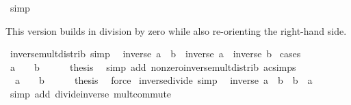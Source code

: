 \begin{isabellebody}
\ simp%
\endisatagproof
{\isafoldproof}%
%
\isadelimproof
%
\endisadelimproof
%
\begin{isamarkuptext}%
This version builds in division by zero while also re-orienting
      the right-hand side.%
\end{isamarkuptext}\isamarkuptrue%
\isamarkupfalse%
\ inverse{\isacharunderscore}{\kern0pt}mult{\isacharunderscore}{\kern0pt}distrib\ {\isacharbrackleft}{\kern0pt}simp{\isacharbrackright}{\kern0pt}{\isacharcolon}{\kern0pt}\isanewline
\ \ {\isachardoublequoteopen}inverse\ {\isacharparenleft}{\kern0pt}a\ {\isacharasterisk}{\kern0pt}\ b{\isacharparenright}{\kern0pt}\ {\isacharequal}{\kern0pt}\ inverse\ a\ {\isacharasterisk}{\kern0pt}\ inverse\ b{\isachardoublequoteclose}\isanewline
%
\isadelimproof
%
\endisadelimproof
%
\isatagproof
{}\isamarkupfalse%
\ cases\isanewline
\ \ \isamarkupfalse%
\ {\isachardoublequoteopen}a\ {\isasymnoteq}\ {}\ {\isasymand}\ b\ {\isasymnoteq}\ {}{\isachardoublequoteclose}\isanewline
\ \ \isamarkupfalse%
\ {\isacharquery}{\kern0pt}thesis\ \isamarkupfalse%
\ {\isacharparenleft}{\kern0pt}simp\ add{\isacharcolon}{\kern0pt}\ nonzero{\isacharunderscore}{\kern0pt}inverse{\isacharunderscore}{\kern0pt}mult{\isacharunderscore}{\kern0pt}distrib\ ac{\isacharunderscore}{\kern0pt}simps{\isacharparenright}{\kern0pt}\isanewline
{}\isamarkupfalse%
\isanewline
\ \ \isamarkupfalse%
\ {\isachardoublequoteopen}{\isasymnot}\ {\isacharparenleft}{\kern0pt}a\ {\isasymnoteq}\ {}\ {\isasymand}\ b\ {\isasymnoteq}\ {}{\isacharparenright}{\kern0pt}{\isachardoublequoteclose}\isanewline
\ \ \isamarkupfalse%
\ {\isacharquery}{\kern0pt}thesis\ \isamarkupfalse%
\ force\isanewline
{}\isamarkupfalse%
%
\endisatagproof
{\isafoldproof}%
%
\isadelimproof
\isanewline
%
\endisadelimproof
\isanewline
{}\isamarkupfalse%
\ inverse{\isacharunderscore}{\kern0pt}divide\ {\isacharbrackleft}{\kern0pt}simp{\isacharbrackright}{\kern0pt}{\isacharcolon}{\kern0pt}\isanewline
\ \ {\isachardoublequoteopen}inverse\ {\isacharparenleft}{\kern0pt}a\ {\isacharslash}{\kern0pt}\ b{\isacharparenright}{\kern0pt}\ {\isacharequal}{\kern0pt}\ b\ {\isacharslash}{\kern0pt}\ a{\isachardoublequoteclose}\isanewline
%
\isadelimproof
\ \ %
\endisadelimproof
%
\isatagproof
{}\isamarkupfalse%
\ {\isacharparenleft}{\kern0pt}simp\ add{\isacharcolon}{\kern0pt}\ divide{\isacharunderscore}{\kern0pt}inverse\ mult{\isachardot}{\kern0pt}commute{\isacharparenright}{\kern0pt}%

\end{isabellebody}
